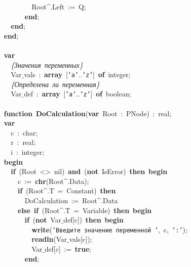 \mbox{}\ \ \ \ \ \ \ \ Root\textasciicircum{}.Left\ :=\ Q; \\
\mbox{}\ \ \ \ \ \ \textbf{end}; \\
\mbox{}\ \ \textbf{end}; \\
\mbox{}\textbf{end}; \\
\mbox{} \\
\mbox{}\textbf{var} \\
\mbox{}\ \ \textit{\{Значения\ переменных\}} \\
\mbox{}\ \ Var$\_$vals\ :\ \textbf{array}\ [\texttt{'a'}..\texttt{'z'}]\ \textbf{of}\ integer; \\
\mbox{}\ \ \textit{\{Определена\ ли\ переменная\}} \\
\mbox{}\ \ Var$\_$def\ :\ \textbf{array}\ [\texttt{'a'}..\texttt{'z'}]\ \textbf{of}\ boolean; \\
\mbox{} \\
\mbox{}\textbf{function}\ \textbf{DoCalculation}(\textbf{var}\ Root\ :\ PNode)\ :\ real; \\
\mbox{}\textbf{var} \\
\mbox{}\ \ c\ :\ char; \\
\mbox{}\ \ r\ :\ real; \\
\mbox{}\ \ i\ :\ integer; \\
\mbox{}\textbf{begin} \\
\mbox{}\ \ \textbf{if}\ (Root\ \textless{}\textgreater{}\ nil)\ \textbf{and}\ (\textbf{not}\ IsError)\ \textbf{then}\ \textbf{begin} \\
\mbox{}\ \ \ \ c\ :=\ \textbf{chr}(Root\textasciicircum{}.Data); \\
\mbox{}\ \ \ \ \textbf{if}\ (Root\textasciicircum{}.T\ =\ Constant)\ \textbf{then} \\
\mbox{}\ \ \ \ \ \ DoCalculation\ :=\ Root\textasciicircum{}.Data \\
\mbox{}\ \ \ \ \textbf{else}\ \textbf{if}\ (Root\textasciicircum{}.T\ =\ Variable)\ \textbf{then}\ \textbf{begin} \\
\mbox{}\ \ \ \ \ \ \textbf{if}\ (\textbf{not}\ Var$\_$def[c])\ \textbf{then}\ \textbf{begin} \\
\mbox{}\ \ \ \ \ \ \ \ \textbf{write}(\texttt{'Введите\ значение\ переменной\ '},\ c,\ \texttt{':'}); \\
\mbox{}\ \ \ \ \ \ \ \ \textbf{readln}(Var$\_$vals[c]); \\
\mbox{}\ \ \ \ \ \ \ \ Var$\_$def[c]\ :=\ \textbf{true}; \\
\mbox{}\ \ \ \ \ \ \textbf{end}; \\
